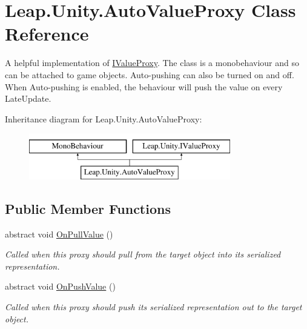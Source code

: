 \hypertarget{class_leap_1_1_unity_1_1_auto_value_proxy}{}\section{Leap.\+Unity.\+Auto\+Value\+Proxy Class Reference}
\label{class_leap_1_1_unity_1_1_auto_value_proxy}


A helpful implementation of \mbox{\hyperlink{interface_leap_1_1_unity_1_1_i_value_proxy}{I\+Value\+Proxy}}. The class is a monobehaviour and so can be attached to game objects. Auto-\/pushing can also be turned on and off. When Auto-\/pushing is enabled, the behaviour will push the value on every Late\+Update.  


Inheritance diagram for Leap.\+Unity.\+Auto\+Value\+Proxy\+:\begin{figure}[H]
\begin{center}
\leavevmode
\includegraphics[height=2.000000cm]{class_leap_1_1_unity_1_1_auto_value_proxy}
\end{center}
\end{figure}
\subsection*{Public Member Functions}
\begin{DoxyCompactItemize}
\item 
abstract void \mbox{\hyperlink{class_leap_1_1_unity_1_1_auto_value_proxy_a2d62ff32cd2a3ca3caaeb5debd19cecf}{On\+Pull\+Value}} ()
\begin{DoxyCompactList}\small\item\em Called when this proxy should pull from the target object into its serialized representation. \end{DoxyCompactList}\item 
abstract void \mbox{\hyperlink{class_leap_1_1_unity_1_1_auto_value_proxy_a4a538b6c13f9d3a961937652098fc9b3}{On\+Push\+Value}} ()
\begin{DoxyCompactList}\small\item\em Called when this proxy should push its serialized representation out to the target object. \end{DoxyCompactList}\end{DoxyCompactItemize}
